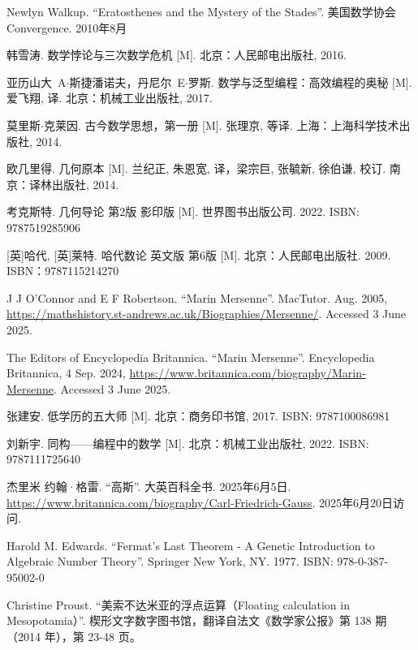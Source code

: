 Newlyn Walkup. ``Eratosthenes and the Mystery of the Stades''. 美国数学协会 Convergence. 2010年8月

韩雪涛. 数学悖论与三次数学危机 [M]. 北京：人民邮电出版社, 2016. %

亚历山大\ A$\cdot$斯捷潘诺夫，丹尼尔\ E$\cdot$罗斯. 数学与泛型编程：高效编程的奥秘 [M]. 爱飞翔, 译. 北京：机械工业出版社, 2017. %

莫里斯$\cdot$克莱因. 古今数学思想，第一册 [M]. 张理京, 等译. 上海：上海科学技术出版社, 2014. %

欧几里得. 几何原本 [M]. 兰纪正, 朱恩宽, 译，梁宗巨, 张毓新, 徐伯谦, 校订. 南京：译林出版社, 2014. %

考克斯特. 几何导论 第2版 影印版 [M]. 世界图书出版公司. 2022. ISBN: 9787519285906

[英]哈代, [英]莱特. 哈代数论 英文版 第6版 [M]. 北京：人民邮电出版社. 2009. ISBN：9787115214270

J J O'Connor and E F Robertson. ``Marin Mersenne''. MacTutor. Aug. 2005, \url{https://mathshistory.st-andrews.ac.uk/Biographies/Mersenne/}. Accessed 3 June 2025.

The Editors of Encyclopedia Britannica. ``Marin Mersenne''. Encyclopedia Britannica, 4 Sep. 2024, \url{https://www.britannica.com/biography/Marin-Mersenne}. Accessed 3 June 2025.

张建安. 低学历的五大师 [M]. 北京：商务印书馆, 2017. ISBN: 9787100086981

刘新宇. 同构——编程中的数学 [M]. 北京：机械工业出版社, 2022. ISBN: 9787111725640

杰里米 约翰·格雷. ``高斯''. 大英百科全书. 2025年6月5日. \url{https://www.britannica.com/biography/Carl-Friedrich-Gauss}. 2025年6月20日访问.

Harold M. Edwards. ``Fermat's Last Theorem - A Genetic Introduction to Algebraic Number Theory''. Springer New York, NY. 1977. ISBN: 978-0-387-95002-0

Christine Proust. ``美索不达米亚的浮点运算（Floating calculation in Mesopotamia）''. 楔形文字数字图书馆，翻译自法文《数学家公报》第 138 期（2014 年），第 23-48 页。

